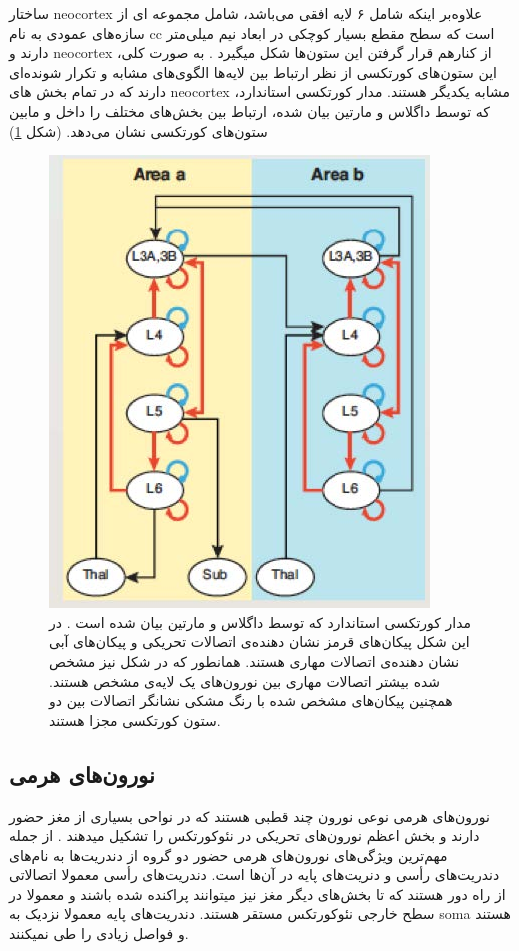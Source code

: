 \documentclass[12pt]{report}
\begin{document}
	ساختار \gls{neocortex} علاوه‌بر اینکه شامل ۶ لایه افقی می‌باشد، شامل مجموعه ای از سازه‌های عمودی به نام \gls{cc} است که سطح مقطع بسیار کوچکی در ابعاد نیم میلی‌متر دارند و \gls{neocortex} از کنار‌هم قرار گرفتن این ستون‌ها شکل میگیرد
	\cite{Horton2005}.
	به صورت کلی، این ستون‌های کورتکسی از نظر ارتباط بین لایه‌ها الگوی‌های مشابه و تکرار شونده‌ای دارند که در تمام بخش های \gls{neocortex} مشابه یکدیگر هستند. مدار کورتکسی استاندارد، که توسط داگلاس و مارتین 
	\cite{Douglas2004}
	بیان شده، ارتباط بین بخش‌های مختلف را داخل و مابین ستون‌های کورتکسی نشان می‌دهد.
	(شکل \ref{fig:cc-doganmart})
	
	\begin{figure}[H]
		\centering
		\includegraphics[width=0.5\linewidth]{cc-con.jpg}
		\caption[NS]{
			مدار کورتکسی استاندارد که توسط داگلاس و مارتین بیان شده است
			\cite{Douglas2004}.
			در این شکل پیکان‌های قرمز نشان دهنده‌ی اتصالات تحریکی و پیکان‌های آبی نشان دهنده‌ی اتصالات مهاری هستند. همانطور که در شکل نیز مشخص شده بیشتر اتصالات مهاری بین نورون‌های یک لایه‌ی مشخص هستند. همچنین پیکان‌های مشخص شده با رنگ مشکی نشانگر اتصالات بین دو ستون کورتکسی مجزا هستند.
		}
		\label{fig:cc-doganmart}
	\end{figure}
	
	
	\subsection{نورون‌های هرمی}
	
	نورون‌های هرمی نوعی نورون چند قطبی هستند که در نواحی بسیاری از مغز حضور دارند و بخش اعظم نورون‌های تحریکی در نئوکورتکس را تشکیل میدهند \cite{Hawkins2016}.
	از جمله مهم‌ترین ویژگی‌های نورون‌های هرمی حضور دو گروه از دندریت‌ها به نام‌های دندریت‌های رأسی و دنریت‌های پایه در آن‌ها است.
	دندریت‌های رأسی معمولا اتصالاتی از راه دور هستند که تا بخش‌های دیگر مغز نیز میتوانند پراکنده شده باشند و معمولا در سطح خارجی نئوکورتکس مستقر هستند\cite{MEGIAS2001527}. دندریت‌‌های پایه معمولا نزدیک به \gls{soma} هستند و فواصل زیادی را طی نمیکنند.
	
\end{document}
